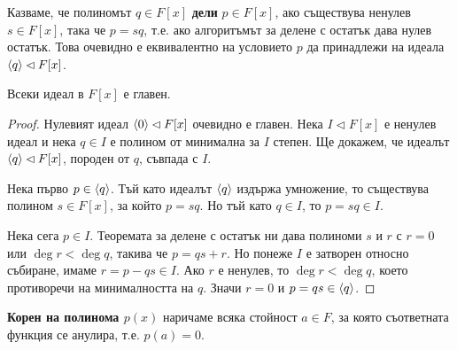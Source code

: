 \documentclass[numbers=endperiod, bibliography=totocnumbered]{scrartcl}
\begin{document}
\begin{definition}
  Казваме, че полиномът \( q \in F[x] \) \textbf{дели} \( p \in F[x] \), ако съществува ненулев \( s \in F[x] \), така че \( p = sq \), т.е. ако алгоритъмът за делене с остатък дава нулев остатък. Това очевидно е еквивалентно на условието \( p \) да принадлежи на идеала \( \left\langle q \right\rangle \lhd F[x] \).
\end{definition}

\begin{theorem}\label{thm:polynomial_ideals_are_principal}
  Всеки идеал в \( F[x] \) е главен.
\end{theorem}
\begin{proof}
  Нулевият идеал \( \left\langle 0 \right\rangle \lhd F[x] \) очевидно е главен. Нека \( I \lhd F[x] \) е ненулев идеал и нека \( q \in I \) е полином от минимална за \( I \) степен. Ще докажем, че идеалът \( \left\langle q \right\rangle \lhd F[x] \), породен от \( q \), съвпада с \( I \).

  Нека първо \( p \in \left\langle q \right\rangle \). Тъй като идеалът \( \left\langle q \right\rangle \) издържа умножение, то съществува полином \( s \in F[x] \), за който \( p = sq \). Но тъй като \( q \in I \), то \( p = sq \in I \).

  Нека сега \( p \in I \). Теоремата за делене с остатък ни дава полиноми \( s \) и \( r \) с \( r = 0 \) или \( \deg r < \deg q \), такива че \( p = qs + r \). Но понеже \( I \) е затворен относно събиране, имаме \( r = p - qs \in I \). Ако \( r \) е ненулев, то \( \deg r < \deg q \), което противоречи на минималността на \( q \). Значи \( r = 0 \) и \( p = qs \in \left\langle q \right\rangle \).
\end{proof}

\begin{definition}
  \textbf{Корен на полинома \( p(x) \)} наричаме всяка стойност \( a \in F \), за която съответната функция се анулира, т.е. \( p(a) = 0 \).
\end{definition}
\end{document}
